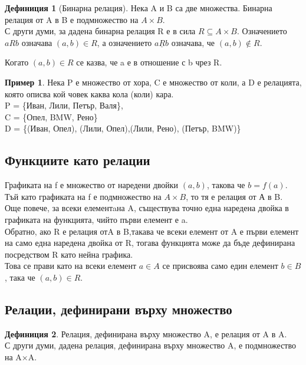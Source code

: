 \documentclass[fleqn, 12pt]{article}
\theoremstyle{definition}
\newtheorem{example}{Пример}[subsection]
\newtheorem{definition}{Дефиниция}[subsection]
\begin{document}
\begin{definition}[Бинарна релация]
Нека A и B са две множества. Бинарна релация от A в B е подмножество на $A \times B$. \\
С други думи, за дадена бинарна релация R е в сила $R \subseteq A \times B$.
Означението $aRb$ означава $(a, b) \in R$, а означението $a \underline{R} b$ означава, че $(a, b) \notin R$.
\end{definition}
Когато  $(a, b) \in R$ се казва, че a е в отношение с b чрез R.\\

\begin{example}
Нека P е множество от хора, C е множество от коли, а D е релацията, която описва кой човек каква кола (коли) кара.\\
P = \{Иван, Лили, Петър, Валя\},\\
C = \{Опел, BMW, Рено\}\\
D = \{(Иван, Опел), (Лили, Опел),(Лили, Рено), (Петър, BMW)\}
\end{example}

\subsection{Функциите като релации}
Графиката на f е множество от наредени двойки $(a, b)$, такова че $b = f(a)$.\\
Тъй като графиката на f е подмножество на $A \times B$, то тя е релация от А в B. \\
Още повече, за всеки елементaна A, съществува точно една наредена двойка в графиката на функцията, чийто първи елемент е a.\\
Обратно, ако R е релация отA в B,такава че всеки елемент от A е първи елемент на само една наредена двойка от R, тогава функцията може да бъде дефинирана посредством R като нейна графика. \\
Това се прави като на всеки елемент $a \in A$ се присвоява само един елемент $b \in B$, така че $(a, b) \in R$.

\subsection{Релации, дефинирани върху множество}

\begin{definition}
Релация, дефинирана върху множество A, е релация от A в A.\\
С други думи, дадена релация, дефинирана върху множество A, е подмножество на A×A.
\end{definition}
\end{document}
